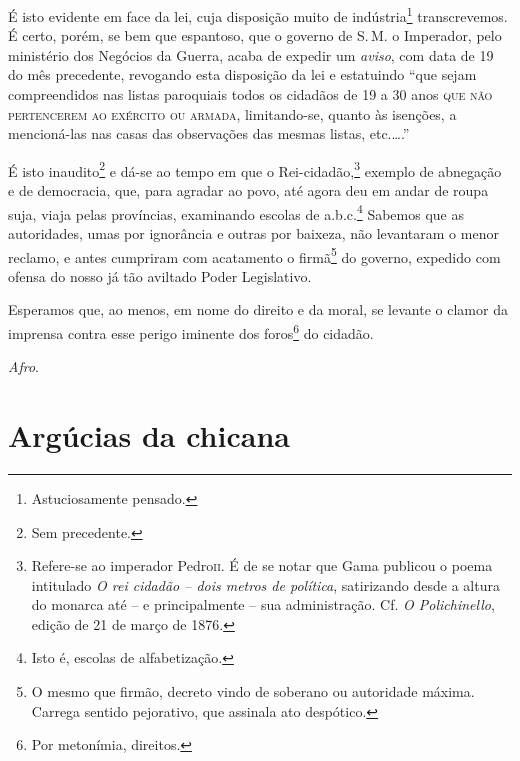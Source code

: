 É isto evidente em face da lei, cuja disposição muito de
indústria\footnote{ Astuciosamente pensado.} transcrevemos. É certo,
porém, se bem que espantoso, que o governo de S.\,M. o Imperador, pelo
ministério dos Negócios da Guerra, acaba de expedir um \emph{aviso}, com
data de 19 do mês precedente, revogando esta disposição da lei e
estatuindo ``que sejam compreendidos nas listas paroquiais todos os
cidadãos de 19 a 30 anos \textsc{que não pertencerem ao exército ou armada},
limitando-se, quanto às isenções, a mencioná-las nas casas das
observações das mesmas listas, etc.\ldots.''

É isto inaudito\footnote{ Sem precedente.} e dá-se ao tempo em que o
Rei-cidadão,\footnote{ Refere-se ao imperador Pedro\textsc{ii}. É de se notar
  que Gama publicou o poema intitulado \emph{O rei cidadão -- dois
  metros de política}, satirizando desde a altura do monarca até -- e
  principalmente -- sua administração. Cf. \emph{O Polichinello}, edição
  de 21 de março de 1876.} exemplo de abnegação e de democracia, que,
para agradar ao povo, até agora deu em andar de roupa suja, viaja pelas
províncias, examinando escolas de a.b.c.\footnote{ Isto é, escolas de
  alfabetização.} Sabemos que as autoridades, umas por ignorância e
outras por baixeza, não levantaram o menor reclamo, e antes cumpriram
com acatamento o firmã\footnote{ O mesmo que firmão, decreto vindo de
  soberano ou autoridade máxima. Carrega sentido pejorativo, que
  assinala ato despótico.} do governo, expedido com ofensa do nosso já
tão aviltado Poder Legislativo.

Esperamos que, ao menos, em nome do direito e da moral, se levante o
clamor da imprensa contra esse perigo iminente dos foros\footnote{ Por
  metonímia, direitos.} do cidadão.

\emph{Afro}.

\part{Argúcias da chicana}

